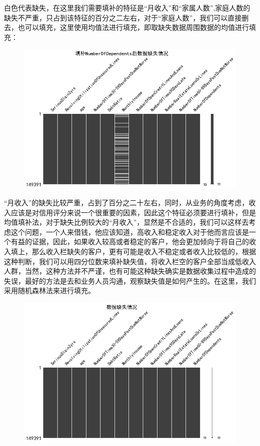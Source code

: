 \documentclass[12pt]{article}
\begin{document}
\begin{flushleft}
	\noindent\qquad 白色代表缺失，在这里我们需要填补的特征是“月收入”和“家属人数”,家庭人数的缺失不严重，只占到该特征的百分之二左右，对于“家庭人数”，我们可以直接删去，也可以填充，这里使用均值法进行填充，即取缺失数据周围数据的均值进行填充：
\end{flushleft}

\begin{figure}[H]
	\centering
	\includegraphics[width=0.8\linewidth]{figures/4}
	\caption{}
\end{figure}

\vspace{1cm}
\begin{flushleft}
	\noindent\qquad “月收入”的缺失比较严重，占到了百分之二十左右，同时，从业务的角度考虑，收入应该是对信用评分来说一个很重要的因素，因此这个特征必须要进行填补，但是均值填补法，对于缺失比例较大的“月收入”，显然是不合适的，我们可以这样去考虑这个问题，一个人来借钱，他应该知道，高收入和稳定收入对于他而言应该是一个有益的证据，因此，如果收入较高或者稳定的客户，他会更加倾向于将自己的收入填上，那么收入栏缺失的客户，更有可能是收入不稳定或者收入比较低的，根据这种判断，我们可以用四分位数来填补缺失值，将收入栏空的客户全部当成低收入人群，当然，这种方法并不严谨，也有可能这种缺失确实是数据收集过程中造成的失误，最好的方法是去和业务人员沟通，观察缺失值是如何产生的。在这里，我们采用随机森林法来进行填充。
\end{flushleft}

\vspace{2cm}

\begin{figure}[H]
	\centering
	\includegraphics[width=0.9\linewidth]{figures/思维导图中可视化部分/绿色-缺失值处理/3}
	\caption{}
\end{figure}
\end{document}

